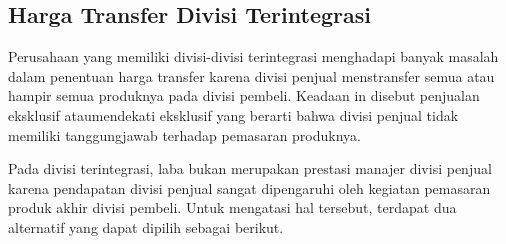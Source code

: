 \subsection{Harga Transfer Divisi Terintegrasi}

Perusahaan yang memiliki divisi-divisi terintegrasi menghadapi banyak masalah dalam penentuan harga transfer karena divisi penjual menstransfer semua atau hampir semua produknya pada divisi pembeli. Keadaan in disebut penjualan eksklusif ataumendekati eksklusif yang berarti bahwa divisi penjual tidak memiliki tanggungjawab terhadap pemasaran produknya.

Pada divisi terintegrasi, laba bukan merupakan prestasi manajer divisi penjual karena pendapatan divisi penjual sangat dipengaruhi oleh kegiatan pemasaran produk akhir divisi pembeli. Untuk mengatasi hal tersebut, terdapat dua alternatif yang dapat dipilih sebagai berikut.

